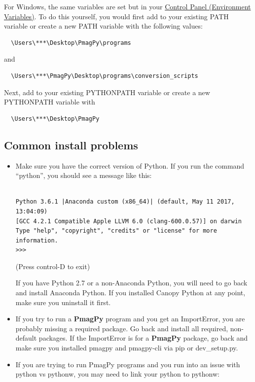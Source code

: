 \documentclass[11pt]{book}
\begin{document}
{For Windows, the same variables are set but in your \href{https://www.java.com/en/download/help/path.xml}{Control Panel (Environment Variables)}.  To do this yourself, you would first add to your existing PATH variable or create a new PATH variable with the following values: \begin{verbatim}
  \Users\***\Desktop\PmagPy\programs
\end{verbatim}
and \begin{verbatim}
  \Users\***\PmagPy\Desktop\programs\conversion_scripts
\end{verbatim}
Next, add to your existing PYTHONPATH variable or create a new PYTHONPATH variable with \begin{verbatim}
  \Users\***\Desktop\PmagPy
\end{verbatim}

\subsection{Common install problems}

\begin{itemize}

\item Make sure you have the correct version of Python.  If you run the command ``python'', you should see a message like this:

\begin{verbatim}

Python 3.6.1 |Anaconda custom (x86_64)| (default, May 11 2017, 13:04:09)
[GCC 4.2.1 Compatible Apple LLVM 6.0 (clang-600.0.57)] on darwin
Type "help", "copyright", "credits" or "license" for more information.
>>>
\end{verbatim}
(Press control-D to exit)

If you have Python 2.7 or a non-Anaconda Python, you will need to go back and install Anaconda Python.  If you installed Canopy Python at any point, make sure you uninstall it first.


\item If you try to run a {\bf PmagPy} program and you get an ImportError, you are probably missing a required package.  Go back and install all required, non-default packages.  If the ImportError is for a {\bf PmagPy} package, go back and make sure you installed pmagpy and pmagpy-cli via pip or dev\_setup.py.

\item If you are trying to run PmagPy programs and you run into an issue with python vs pythonw, you may need to link your python to pythonw:
  \begin{verbatim}


\end{verbatim}
\end{itemize}}
\end{document}
